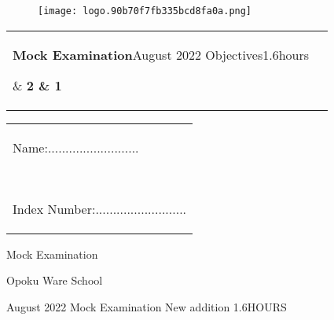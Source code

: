 \documentclass{article}
\begin{document}
\begin{figure}
  \centering
  \texttt{[image: logo.90b70f7fb335bcd8fa0a.png]}
\end{figure}
	\begin{tabular}{ | m{5cm}  m{3cm}|  }

	\hline
		\parbox[m]{10cm}{\vspace*{8pt} \textbf{\large Mock Examination}\newline August 2022 \newline  \newline Objectives\newline  1.6hours \vspace*{4pt}}& \hspace*{0.5cm} {\textbf{\huge 2 \& 1}} \\
		\hline
	\end{tabular}
		\begin{tabular}{  m{5em}  }
	
		\parbox[m]{15cm}{\hspace*{0.5cm}Name:.......................... 
		  \vspace*{1pt}} \
		  	\parbox[m]{15cm}{\hspace*{0.5cm}Index Number:.......................... 
		  \vspace*{1pt}}
	
	\end{tabular}
\begin{center}
Mock Examination
\end{center}
\begin{center}
Opoku Ware School
\end{center}
August 2022 \hfill Mock Examination New addition \hfill 1.6HOURS
\end{document}
